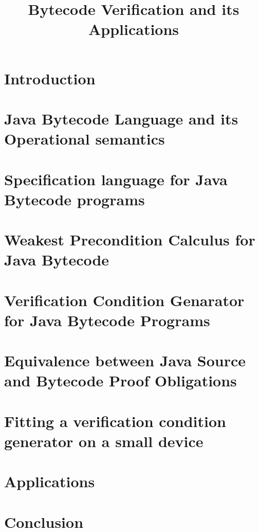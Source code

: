 \documentclass[a4paper]{article}
\title{Bytecode Verification and its Applications}
\begin{document}
\renewcommand{\topfraction}{0.9}
\renewcommand{\textfraction}{0.05}
\renewcommand{\floatpagefraction}{0.75}

\maketitle
\tableofcontents
\newpage
\section{Introduction}

\section{ Java Bytecode Language and its Operational semantics}
   


   
\section{ Specification language for Java Bytecode programs} 
   

\section{ Weakest Precondition Calculus for Java Bytecode} \label{wpGeneral}
     



\section{ Verification Condition Genarator for Java Bytecode Programs}

\section{ Equivalence between Java Source and Bytecode Proof Obligations}





\section{ Fitting a verification condition generator on a small device}



\section{ Applications} 

 
\section{ Conclusion}



\end{document}
